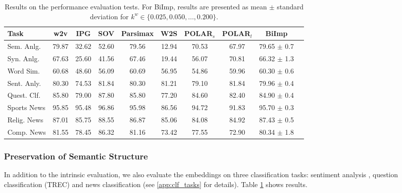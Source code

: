 \documentclass[11pt,a4paper]{article}
\def\proposedmethod{BiImp}
\begin{document}
\begin{table}
    \centering
	\begin{tabular}{lccccccccc}
		\hline \hline 
		\textbf{Task} & \textbf{w2v} & \textbf{IPG} & \textbf{SOV} & \textbf{Parsimax} & \textbf{W2S} & \textbf{POLAR$_s$} & \textbf{POLAR$_l$} & \textbf{\proposedmethod{}} \\ \hline \hline %
	    Sem. Anlg. & 79.87 & 32.62 & 52.60 & 79.56 & 12.94 & 70.53 & 67.97 & 79.65 $\pm$ 0.7 \\
	    Syn. Anlg. & 67.63 & 25.60 & 41.56 & 67.46 & 19.44 & 56.07 & 70.81 & 66.32 $\pm$ 1.3 \\ 
	    \hline %
	    Word Sim. & 60.68 & 48.60 & 56.09 & 60.69 & 56.95 & 54.86 & 59.96 & 60.30 $\pm$ 0.6 \\
	    \hline %
	    Sent. Anly. & 80.30 & 74.53 & 81.84 & 80.30 & 81.21 & 79.10 & 81.84 & 79.96 $\pm$ 0.4 \\ \hline %
	    Quest. Clf. & 85.80 & 79.00 & 87.80 & 85.80 & 77.20 & 84.60 & 82.40 & 84.90 $\pm$ 0.4 \\ \hline %
	    Sports News & 95.85 & 95.48 & 96.86 & 95.98 & 86.56 & 94.72 & 91.83 & 95.70 $\pm$ 0.3 \\
	    Relig. News & 87.01 & 85.75 & 88.55 & 86.87 & 85.06 & 84.08 & 84.92 & 87.43 $\pm$ 0.5 \\
	    Comp. News & 81.55 & 78.45 & 86.32 & 81.16 & 73.42 & 77.55 & 72.90 & 80.34 $\pm$ 1.8 \\ \hline \hline %
	\end{tabular}
	\caption{ Results on the performance evaluation tests. For \proposedmethod{}, results are presented as mean $\pm$
standard deviation for $k^w \in \{0.025,0.050,...,0.200\}$.}
	\label{tab:performance_tests}
\end{table}

\subsubsection{Preservation of Semantic Structure}
In addition to the intrinsic evaluation, we also evaluate
the embeddings on three classification tasks: sentiment analysis \citep{socher13treebank}, question classification (TREC) \citep{li06learning} and news classification \citep{faruqui15sparse} (see \ref{app:clf_tasks} for details). 
Table \ref{tab:performance_tests} shows results.

\end{document}
